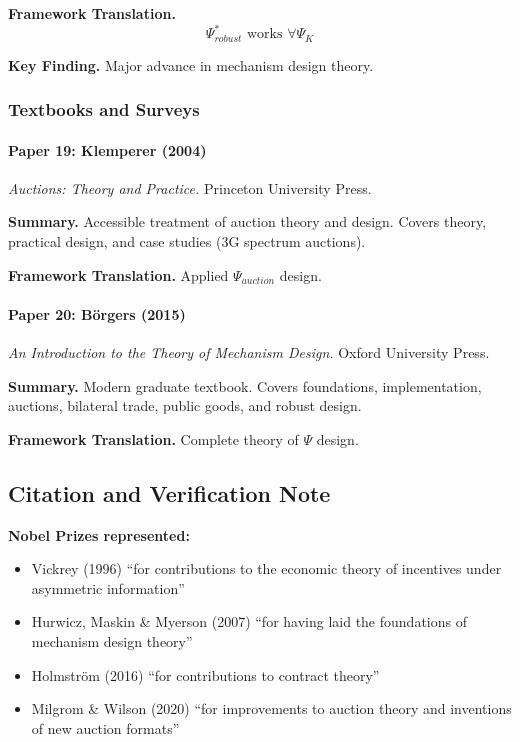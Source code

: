 \textbf{Framework Translation.}
\begin{equation}
\Psi^*_{robust} \text{ works } \forall \Psi_K
\end{equation}

\textbf{Key Finding.}
Major advance in mechanism design theory.

\subsubsection{Textbooks and Surveys}

\paragraph{Paper 19: Klemperer (2004)}

\textit{Auctions: Theory and Practice.}
Princeton University Press.

\textbf{Summary.}
Accessible treatment of auction theory and design. Covers theory, 
practical design, and case studies (3G spectrum auctions).

\textbf{Framework Translation.}
Applied $\Psi_{auction}$ design.

\paragraph{Paper 20: Börgers (2015)}

\textit{An Introduction to the Theory of Mechanism Design.}
Oxford University Press.

\textbf{Summary.}
Modern graduate textbook. Covers foundations, implementation, auctions, 
bilateral trade, public goods, and robust design.

\textbf{Framework Translation.}
Complete theory of $\Psi$ design.

\subsection{Citation and Verification Note}

\textbf{Nobel Prizes represented:}
\begin{itemize}
    \item Vickrey (1996) ``for contributions to the economic theory of incentives under asymmetric information''
    \item Hurwicz, Maskin \& Myerson (2007) ``for having laid the foundations of mechanism design theory''
    \item Holmström (2016) ``for contributions to contract theory''
    \item Milgrom \& Wilson (2020) ``for improvements to auction theory and inventions of new auction formats''
\end{itemize}

